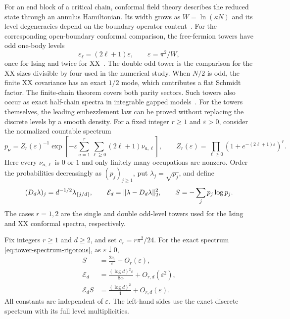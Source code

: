For an end block of a critical chain, conformal field theory describes the
reduced state through an annulus Hamiltonian. Its width grows as
$W=\ln(\kappa N)$ and its level degeneracies depend on the boundary
operator content~\cite{PeschelEisler09,Lauchli13,CardyTonni16,ACT18}.
For the corresponding open-boundary conformal comparison, the free-fermion
towers have odd one-body levels
\begin{equation}\label{eq:levels}
\varepsilon_\ell=(2\ell+1)\varepsilon,\qquad
\varepsilon=\pi^2/W,
\end{equation}
once for Ising and twice for XX~\cite{IgloiJuhasz08}. The double odd tower
is the comparison for the XX sizes divisible by four used in the numerical
study. When $N/2$ is odd, the finite XX covariance has an exact $1/2$ mode,
which contributes a flat Schmidt factor. The finite-chain theorem
covers both parity sectors. Such towers also occur
as exact half-chain spectra in integrable gapped models~\cite{PKL99}.
For the towers themselves, the leading embezzlement law can be proved
without replacing the discrete levels by a smooth density.
For a fixed integer $r\geq1$ and $\varepsilon>0$, consider the normalized
countable spectrum
\begin{equation}\label{eq:tower-spectrum-rigorous}
 p_{\boldsymbol\nu}=Z_r(\varepsilon)^{-1}
 \exp\!\left[-\varepsilon
   \sum_{a=1}^{r}\sum_{\ell\geq0}(2\ell+1)\nu_{a,\ell}\right],
 \qquad
 Z_r(\varepsilon)=\prod_{\ell\geq0}
       (1+e^{-(2\ell+1)\varepsilon})^r .
\end{equation}
Here every $\nu_{a,\ell}$ is $0$ or $1$ and only finitely many occupations
are nonzero.  Order the probabilities decreasingly as $(p_j)_{j\geq1}$,
put $\lambda_j=\sqrt{p_j}$, and define
\[
 (D_d\lambda)_j=d^{-1/2}\lambda_{\lceil j/d\rceil},
 \qquad
 \mathcal E_d=\lVert \lambda-D_d\lambda\rVert_2^2,
 \qquad S=-\sum_j p_j\log p_j .
\]
The cases $r=1,2$ are the single and double odd-level towers used for
the Ising and XX conformal spectra, respectively.

\begin{theorem}\label{thm:exact-tower-law}
Fix integers $r\geq1$ and $d\geq2$, and set
$c_r=r\pi^2/24$.  For the exact spectrum
\eqref{eq:tower-spectrum-rigorous}, as $\varepsilon\downarrow0$,
\begin{align}
 S&=\frac{2c_r}{\varepsilon}+O_r(\varepsilon),
 \label{eq:tower-entropy-rigorous}\\
 \mathcal E_d
 &=\frac{(\log d)^2\varepsilon}{8c_r}
       +O_{r,d}(\varepsilon^2),
 \label{eq:tower-error-rigorous}\\
 \mathcal E_d S&=\frac{(\log d)^2}{4}
       +O_{r,d}(\varepsilon).
 \label{eq:tower-product-rigorous}
\end{align}
All constants are independent of $\varepsilon$. The left-hand sides use
the exact discrete spectrum with its full level multiplicities.
\end{theorem}


